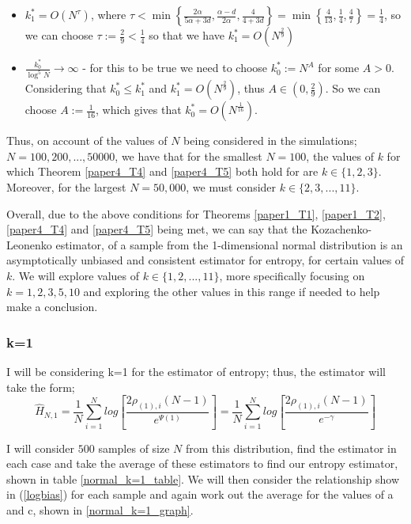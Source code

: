 \documentclass{article}
\begin{document}
\begin{itemize}
\item $k_{1}^{*} = O(N^{\tau})$, where $\tau < \min \left\{ \frac{2 \alpha}{5 \alpha + 3d} , \frac{\alpha - d}{2 \alpha} , \frac{4}{4 + 3d} \right\} = \min \left\{ \frac{4}{13}, \frac{1}{4}, \frac{4}{7} \right\} = \frac{1}{4}$, so we can choose $\tau := \frac{2}{9} < \frac{1}{4}$ so that we have $k_{1}^{*} = O(N^{\frac{2}{9}})$

\item $\frac{k_{0}^{*}}{\log^{5}{N}} \to \infty$ - for this to be true we need to choose $k_{0}^{*} := N^A$ for some $A>0$. Considering that $k_{0}^{*} \leq k_{1}^{*}$ and $ k_{1}^{*} = O(N^{\frac{2}{9}})$, thus $A \in (0, \frac{2}{9})$. So we can choose $A := \frac{1}{16}$, which gives that $k_{0}^{*} = O(N^{\frac{1}{16}})$.
\end{itemize}

Thus, on account of the values of $N$ being considered in the simulations; $N=100, 200, ..., 50000$, we have that for the smallest $N=100$, the values of $k$ for which Theorem \ref{paper4_T4} and \ref{paper4_T5} both hold for are $k \in \{1, 2, 3\}$. Moreover, for the largest $N=50,000$, we must consider $k \in \{2, 3, ..., 11\}$.

Overall, due to the above conditions for Theorems \ref{paper1_T1}, \ref{paper1_T2}, \ref{paper4_T4} and \ref{paper4_T5} being met, we can say that the Kozachenko-Leonenko estimator, of a sample from the 1-dimensional normal distribution is an asymptotically unbiased and consistent estimator for entropy, for certain values of $k$. We will explore values of $k \in \{1, 2, ..., 11\}$, more specifically focusing on $k=1, 2, 3, 5, 10$ and exploring the other values in this range if needed to help make a conclusion.




\subsubsection{k=1} \label{N_k=1}
I will be considering k=1 for the estimator of entropy; thus, the estimator will take the form;
\begin{equation} 
\hat{H}_{N, 1} = \frac{1}{N} \sum_{i=1}^{N} log \left[ \frac{2\rho_{(1),i} (N-1)}{e^{\Psi(1)}} \right] = \frac{1}{N} \sum_{i=1}^{N} log \left[ \frac{2\rho_{(1),i} (N-1)}{e^{-\gamma}} \right] \nonumber
\end{equation}

I will consider $500$ samples of size $N$ from this distribution, find the estimator in each case and take the average of these estimators to find our entropy estimator, shown in table \ref{normal_k=1_table}. We will then consider the relationship show in (\ref{logbias}) for each sample and again work out the average for the values of a and c, shown in \ref{normal_k=1_graph}.
\end{document}
